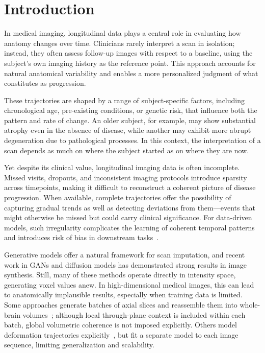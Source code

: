 \section{Introduction}

In medical imaging, longitudinal data plays a central role in evaluating how anatomy changes over time. Clinicians rarely interpret a scan in isolation; instead, they often assess follow-up images with respect to a baseline, using the subject’s own imaging history as the reference point. This approach accounts for natural anatomical variability and enables a more personalized judgment of what constitutes as progression.

These trajectories are shaped by a range of subject-specific factors, including chronological age, pre-existing conditions, or genetic risk, that influence both the pattern and rate of change. An older subject, for example, may show substantial atrophy even in the absence of disease, while another may exhibit more abrupt degeneration due to pathological processes. In this context, the interpretation of a scan depends as much on where the subject started as on where they are now.

Yet despite its clinical value, longitudinal imaging data is often incomplete. Missed visits, dropouts, and inconsistent imaging protocols introduce sparsity across timepoints, making it difficult to reconstruct a coherent picture of disease progression. When available, complete trajectories offer the possibility of capturing gradual trends as well as detecting deviations from them—events that might otherwise be missed but could carry clinical significance. For data-driven models, such irregularity complicates the learning of coherent temporal patterns and introduces risk of bias in downstream tasks~\cite{gabel2022retaining,yuan2024remind,little2009}.

Generative models offer a natural framework for scan imputation, and recent work in GANs and diffusion models has demonstrated strong results in image synthesis. Still, many of these methods operate directly in intensity space, generating voxel values anew. In high-dimensional medical images, this can lead to anatomically implausible results, especially when training data is limited. Some approaches generate batches of axial slices and reassemble them into whole-brain volumes~\cite{yuan2024remind}; although local through-plane context is included within each batch, global volumetric coherence is not imposed explicitly. Others model deformation trajectories explicitly~\cite{bai2024noder}, but fit a separate model to each image sequence, limiting generalization and scalability.

